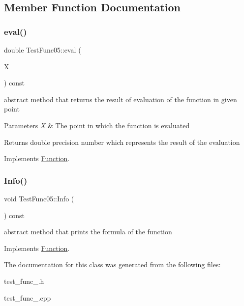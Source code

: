 \subsection{Member Function Documentation}
\mbox{\label{class_test_func05_a2848dbb9b76d0db3a701ce69ec700923}} 
\subsubsection{\texorpdfstring{eval()}{eval()}}
{\footnotesize\ttfamily double Test\+Func05\+::eval (\begin{DoxyParamCaption}\item[{const \hyperlink{classv_point}{v\+Point} \&}]{X }\end{DoxyParamCaption}) const\hspace{0.3cm}{\ttfamily [virtual]}}

abstract method that returns the result of evaluation of the function in given point 
\begin{DoxyParams}{Parameters}
{\em X} & The point in which the function is evaluated \\
\hline
\end{DoxyParams}
\begin{DoxyReturn}{Returns}
double precision number which represents the result of the evaluation 
\end{DoxyReturn}


Implements \hyperlink{class_function_a8b9d55271a531b6f5bef09bfae0a23d9}{Function}.

\mbox{\label{class_test_func05_a2a1c8696724c5195e92b4194d6205dcb}} 
\subsubsection{\texorpdfstring{Info()}{Info()}}
{\footnotesize\ttfamily void Test\+Func05\+::\+Info (\begin{DoxyParamCaption}{ }\end{DoxyParamCaption}) const\hspace{0.3cm}{\ttfamily [virtual]}}

abstract method that prints the formula of the function 

Implements \hyperlink{class_function_a6915be18a065224ed73b1288c6125948}{Function}.



The documentation for this class was generated from the following files\+:\begin{DoxyCompactItemize}
\item 
test\+\_\+func\+\_.\+h\item 
test\+\_\+func\+\_.\+cpp\end{DoxyCompactItemize}
